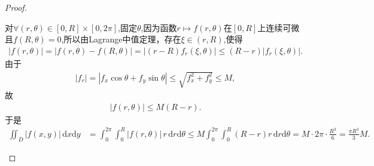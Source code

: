 \documentclass[../../main.tex]{subfiles}%
\begin{document}
\begin{proof}
\begin{enumerate}[(1)]
对$\forall (r,\theta)\in [0,R]\times [0,2\pi]$,固定$\theta$,因为函数$r\mapsto f(r,\theta)$在$[0,R]$上连续可微且$f(R,\theta)=0$,所以由Lagrange中值定理，存在$\xi\in(r,R)$,使得
\begin{align*}
|f(r,\theta)|=|f(r,\theta)-f(R,\theta)|=|(r-R)f_r(\xi,\theta)|\leqslant (R-r)|f_r(\xi,\theta)|.
\end{align*}
由于
\begin{align*}
|f_r|=|f_x\cos\theta+f_y\sin\theta|\leqslant \sqrt{f_x^2+f_y^2}\leqslant M,
\end{align*}
故
\begin{align*}
|f(r,\theta)|\leqslant M(R-r).
\end{align*}
于是
\begin{align*}
\iint_D |f(x,y)|\,\mathrm{d}x\mathrm{d}y
&=\int_0^{2\pi}\int_0^R |f(r,\theta)|\,r\,\mathrm{d}r\mathrm{d}\theta \leqslant M\int_0^{2\pi}\int_0^R (R-r)r\,\mathrm{d}r\mathrm{d}\theta
=M\cdot 2\pi\cdot \frac{R^3}{6} =\frac{\pi R^3}{3}M.
\end{align*}
\end{enumerate}
\end{proof}
\end{document}
